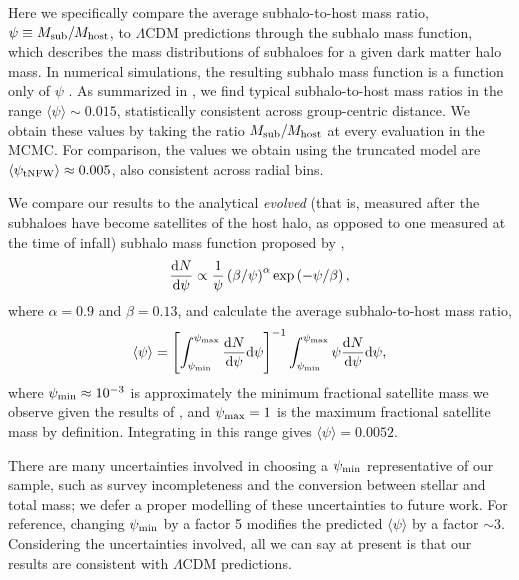 Here we specifically compare the average subhalo-to-host mass ratio, $\psi \equiv M_{\rm 
sub}/M_{\rm host}$, to $\Lambda$CDM predictions through the subhalo mass function, which describes 
the mass distributions of subhaloes for a given dark matter halo mass. In numerical simulations, the 
resulting subhalo mass function is a function only of $\psi$ 
\citep[e.g.,][]{vdbosch05,jiang16}. 
As summarized in , we find typical subhalo-to-host mass ratios in the range 
$\langle\psi\rangle\sim0.015$, statistically consistent across group-centric distance. We obtain 
these values by taking the ratio $M_{\rm sub}/M_{\rm host}$ at every evaluation in the MCMC. For 
comparison, the values we obtain using the truncated model are $\langle\psi_{\rm 
tNFW}\rangle\approx0.005$, also consistent across radial bins.

We compare our results to the analytical \emph{evolved} (that is, measured after the subhaloes have 
become satellites of the host halo, as opposed to one measured at the time of infall) subhalo mass 
function proposed by \cite{vdbosch05},
\begin{equation}\label{eq:shmf}
 \frac{{\rm d}N}{{\rm d}\psi} \propto \frac1{\psi}\left(\beta/\psi\right)^\alpha 
\exp\left(-\psi/\beta\right),
\end{equation}
where $\alpha=0.9$ and $\beta=0.13$, and calculate the average subhalo-to-host mass ratio,
\begin{equation}
 \langle\psi\rangle =
  \left[\int_{\psi_{\rm min}}^{\psi_{\rm max}}\frac{{\rm d}N}{{\rm d}\psi}{\rm d}\psi\right]^{-1} 
   \int_{\psi_{\rm min}}^{\psi_{\rm max}} \psi\frac{{\rm d}N}{{\rm d}\psi}{\rm d}\psi,
\end{equation}
where $\psi_{\rm min}\approx10^{-3}$ is approximately the minimum fractional satellite mass we 
observe given the results of , and $\psi_{\rm max}=1$ is the maximum fractional 
satellite mass by definition. Integrating in this range gives $\langle\psi\rangle=0.0052$.

There are many uncertainties involved in choosing a $\psi_{\rm min}$ representative of our sample, 
such as survey incompleteness and the conversion between stellar and total mass; we defer a proper 
modelling of these uncertainties to future work. For reference, changing $\psi_{\rm min}$ by a 
factor 5 modifies the predicted $\langle\psi\rangle$ by a factor $\sim$3. Considering the 
uncertainties involved, all we can say at present is that our results are consistent with 
$\Lambda$CDM predictions.


